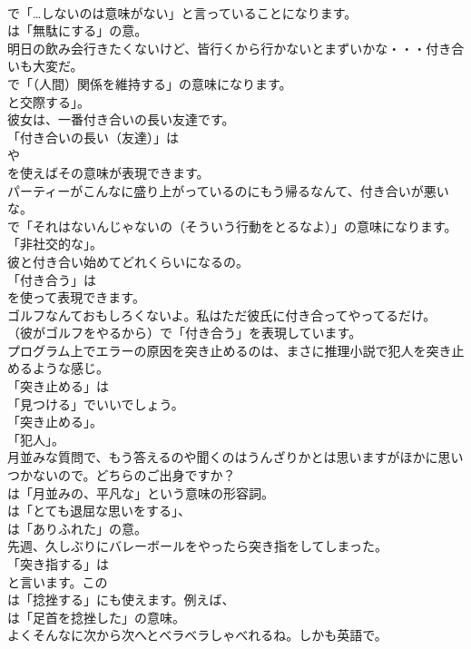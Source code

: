 \documentclass[8pt]{extreport}
\begin{document}
\begin{CJK}{UTF8}{min}
\\	で「…しないのは意味がない」と言っていることになります。
\\	は「無駄にする」の意。	
\\	明日の飲み会行きたくないけど、皆行くから行かないとまずいかな・・・付き合いも大変だ。 
\\	で「（人間）関係を維持する」の意味になります。
\\	と交際する」。	
\\	彼女は、一番付き合いの長い友達です。 
\\	「付き合いの長い（友達）」は
\\	や
\\	を使えばその意味が表現できます。	
\\	パーティーがこんなに盛り上がっているのにもう帰るなんて、付き合いが悪いな。 
\\	で「それはないんじゃないの（そういう行動をとるなよ）」の意味になります。
\\	「非社交的な」。	
\\	彼と付き合い始めてどれくらいになるの。 
\\	「付き合う」は
\\	を使って表現できます。	
\\	ゴルフなんておもしろくないよ。私はただ彼氏に付き合ってやってるだけ。 
\\	（彼がゴルフをやるから）で「付き合う」を表現しています。	
\\	プログラム上でエラーの原因を突き止めるのは、まさに推理小説で犯人を突き止めるような感じ。 
\\	「突き止める」は
\\	「見つける」でいいでしょう。
\\	「突き止める」。
\\	「犯人」。	
\\	月並みな質問で、もう答えるのや聞くのはうんざりかとは思いますがほかに思いつかないので。どちらのご出身ですか？ 
\\	は「月並みの、平凡な」という意味の形容詞。
\\	は「とても退屈な思いをする」、
\\	は「ありふれた」の意。	
\\	先週、久しぶりにバレーボールをやったら突き指をしてしまった。 
\\	「突き指する」は
\\	と言います。この
\\	は「捻挫する」にも使えます。例えば、
\\	は「足首を捻挫した」の意味。	
\\	よくそんなに次から次へとベラベラしゃべれるね。しかも英語で。 

\end{CJK}
\end{document}
